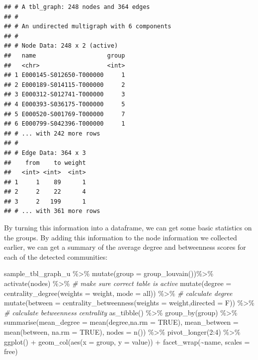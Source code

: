 \documentclass[
]{book}
\newenvironment{Shaded}{\begin{snugshade}}{\end{snugshade}}
\newcommand{\AttributeTok}[1]{\textcolor[rgb]{0.77,0.63,0.00}{#1}}
\newcommand{\CommentTok}[1]{\textcolor[rgb]{0.56,0.35,0.01}{\textit{#1}}}
\newcommand{\ConstantTok}[1]{\textcolor[rgb]{0.00,0.00,0.00}{#1}}
\newcommand{\DecValTok}[1]{\textcolor[rgb]{0.00,0.00,0.81}{#1}}
\newcommand{\FunctionTok}[1]{\textcolor[rgb]{0.00,0.00,0.00}{#1}}
\newcommand{\NormalTok}[1]{#1}
\newcommand{\SpecialCharTok}[1]{\textcolor[rgb]{0.00,0.00,0.00}{#1}}
\newcommand{\StringTok}[1]{\textcolor[rgb]{0.31,0.60,0.02}{#1}}
\begin{document}
\begin{verbatim}
## # A tbl_graph: 248 nodes and 364 edges
## #
## # An undirected multigraph with 6 components
## #
## # Node Data: 248 x 2 (active)
##   name                    group
##   <chr>                   <int>
## 1 E000145-S012650-T000000     1
## 2 E000189-S014115-T000000     2
## 3 E000312-S012741-T000000     3
## 4 E000393-S036175-T000000     5
## 5 E000520-S001769-T000000     7
## 6 E000799-S042396-T000000     1
## # ... with 242 more rows
## #
## # Edge Data: 364 x 3
##    from    to weight
##   <int> <int>  <int>
## 1     1    89      1
## 2     2    22      4
## 3     2   199      1
## # ... with 361 more rows
\end{verbatim}

By turning this information into a dataframe, we can get some basic statistics on the groups. By adding this information to the node information we collected earlier, we can get a summary of the average degree and betweenness scores for each of the detected communities:

\begin{Shaded}
\begin{Highlighting}[]
\NormalTok{sample\_tbl\_graph\_u }\SpecialCharTok{\%\textgreater{}\%} 
  \FunctionTok{mutate}\NormalTok{(}\AttributeTok{group =} \FunctionTok{group\_louvain}\NormalTok{())}\SpecialCharTok{\%\textgreater{}\%} 
  \FunctionTok{activate}\NormalTok{(nodes) }\SpecialCharTok{\%\textgreater{}\%} \CommentTok{\# make sure correct table is active}
  \FunctionTok{mutate}\NormalTok{(}\AttributeTok{degree =} \FunctionTok{centrality\_degree}\NormalTok{(}\AttributeTok{weights =}\NormalTok{ weight, }\AttributeTok{mode =} \StringTok{\textquotesingle{}all\textquotesingle{}}\NormalTok{)) }\SpecialCharTok{\%\textgreater{}\%} \CommentTok{\# calculate degree}
  \FunctionTok{mutate}\NormalTok{(}\AttributeTok{between =} \FunctionTok{centrality\_betweenness}\NormalTok{(}\AttributeTok{weights =}\NormalTok{ weight,}\AttributeTok{directed =}\NormalTok{ F)) }\SpecialCharTok{\%\textgreater{}\%}  \CommentTok{\# calculate betweenness centrality}
  \FunctionTok{as\_tibble}\NormalTok{()  }\SpecialCharTok{\%\textgreater{}\%} \FunctionTok{group\_by}\NormalTok{(group) }\SpecialCharTok{\%\textgreater{}\%}
  \FunctionTok{summarise}\NormalTok{(}\AttributeTok{mean\_degree =} \FunctionTok{mean}\NormalTok{(degree,}\AttributeTok{na.rm =} \ConstantTok{TRUE}\NormalTok{), }\AttributeTok{mean\_between =} \FunctionTok{mean}\NormalTok{(between, }\AttributeTok{na.rm =} \ConstantTok{TRUE}\NormalTok{), }\AttributeTok{nodes =} \FunctionTok{n}\NormalTok{()) }\SpecialCharTok{\%\textgreater{}\%} \FunctionTok{pivot\_longer}\NormalTok{(}\DecValTok{2}\SpecialCharTok{:}\DecValTok{4}\NormalTok{) }\SpecialCharTok{\%\textgreater{}\%} 
  \FunctionTok{ggplot}\NormalTok{() }\SpecialCharTok{+} \FunctionTok{geom\_col}\NormalTok{(}\FunctionTok{aes}\NormalTok{(}\AttributeTok{x =}\NormalTok{ group, }\AttributeTok{y =}\NormalTok{ value)) }\SpecialCharTok{+} \FunctionTok{facet\_wrap}\NormalTok{(}\SpecialCharTok{\textasciitilde{}}\NormalTok{name, }\AttributeTok{scales =} \StringTok{\textquotesingle{}free\textquotesingle{}}\NormalTok{)}
\end{Highlighting}
\end{Shaded}
\end{document}

